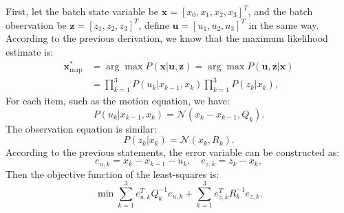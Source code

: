 First, let the batch state variable be $\mathbf{x} = [x_0,x_1, x_2, x_3]^T$, and the batch observation be $\mathbf{z} = [z_1,z_2,z_3]^T$, define $\mathbf{u}=[u_1,u_2,u_3]^T$ in the same way. According to the previous derivation, we know that the maximum likelihood estimate is:
\begin{equation}
    \begin{aligned}
        {\mathbf{x}_{\mathrm{map}}^*} &= \arg \max P(\mathbf{x}|\mathbf{u},\mathbf{z}) = \arg \max P( \mathbf{u},\mathbf{z}|\mathbf{x})\\
        &= \prod\limits_{k = 1}^3 {P({u_k}|{x_{k-1}},{x_k})\prod\limits_{k = 1}^3 {P\left( { {z_k}|{x_k}} \right)} },
    \end{aligned}
\end{equation}
For each item, such as the motion equation, we have:
\begin{equation}
    P({u_k}|{x_{k-1}},{x_k}) = \mathcal{N}({x_k}-{x_{k-1}},{Q_k}).
\end{equation}
The observation equation is similar:
\begin{equation}
    P\left( {{z_k}|{x_k}} \right) = \mathcal{N}\left( {{x_k},{R_k}} \right).
\end{equation}
According to the previous statements, the error variable can be constructed as:
\begin{equation}
    {e_{u,k}} = {x_k}-{x_{k-1}}-{u_k}, \quad {e_{z,k}} = {z_k}-{x_k},
\end{equation}
Then the objective function of the least-squares is:
\begin{equation}
    \min \sum\limits_{k = 1}^3 {e_{u,k}^T Q_k^{-1}{e_{u,k}}} + \sum\limits_{k = 1 }^3 {e_{z,k}^T{R^{-1}_k}{e_{z,k}}}.
\end{equation}

